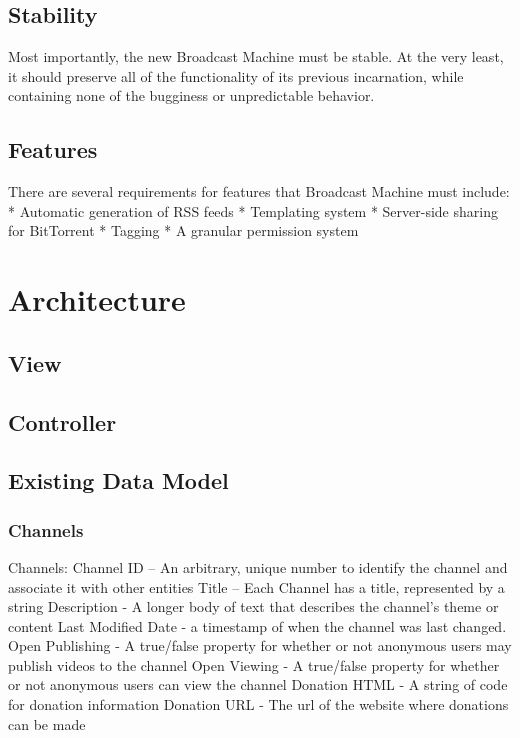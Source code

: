 \documentclass[a4paper,12pt]{report}
\begin{document}
\section{Stability}

	Most importantly, the new Broadcast Machine must be stable. 
At the very least, it should preserve all of the functionality of its previous incarnation, while containing none of the bugginess or unpredictable behavior. 

\section{Features}
	There are several requirements for features that Broadcast Machine must include:
 * Automatic generation of RSS feeds
 * Templating system
 * Server-side sharing for BitTorrent
 * Tagging
 * A granular permission system

\chapter{Architecture}

\section{View}

\section{Controller}

\section{Existing Data Model}

\subsection{Channels}
Channels:
	Channel ID – An arbitrary, unique number to identify the channel and  associate it with other entities
	Title – Each Channel has a title, represented by a string
	Description - A longer body of text that describes the channel's theme or content
	Last Modified Date - a timestamp of when the channel was last changed.
	Open Publishing - A true/false property for whether or not anonymous users may publish videos to the channel
	Open Viewing - A true/false property for whether or not anonymous users can view the channel
	Donation HTML - A string of code for donation information
	Donation URL - The url of the website where donations can be made 
\end{document}
